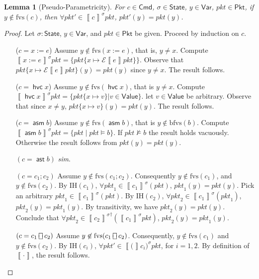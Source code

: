 \documentclass{article}
\newcommand{\pkt}{\mathit{pkt}}
\newcommand{\denote}[1]{\left\llbracket#1\right\rrbracket}
\newcommand{\edenote}[1]{\mathcal{E}\denote{#1}}
\newcommand{\Value}{\mathsf{Value}}
\newcommand{\Cmd}{\mathsf{Cmd}}
\newcommand{\Pkt}{\mathsf{Pkt}}
\newcommand{\Var}{\mathsf{Var}}
\newcommand{\State}{\mathsf{State}}
\newcommand{\assert}{\mathop{\mathsf{ast}}}
\newcommand{\assume}{\mathop{\mathsf{asm}}}
\newcommand{\choiceop}{\rotatebox[origin=c]{90}{$\sqsubset\!\!\!\sqsupset$}}
\newcommand{\choice}{\mathbin{\choiceop}}
\newcommand{\havoc}[1]{\mathop{\mathsf{hvc}}#1}
\newcommand{\fvs}{\textrm{fvs}}
\newcommand{\bfvs}{\textrm{bfvs}}
\theoremstyle{plain}
\newtheorem{lemma}{Lemma}
\theoremstyle{definition}
\theoremstyle{remark}
\begin{document}
\begin{lemma}[Pseudo-Parametricity]
  \label{lem:parametricity}
  For $c \in \Cmd$, $\sigma \in \State$, $y \in \Var$, $\pkt \in \Pkt$, if $y
  \not\in \fvs(c)$, then $\forall \pkt' \in \denote{c}^\sigma \pkt$, $\pkt'(y) =
  \pkt(y)$.
\end{lemma}

\begin{proof}
  Let $\sigma : \State $, $y \in \Var$, and $\pkt \in \Pkt$ be given.
  Proceed by induction on $c$.
  \begin{enumerate}[align=left]
  \item[($c = x := e$)] Assume $y \not \in \fvs(x:=e)$, that is, $y \neq x$.
    Compute $\denote{x:=e}^\sigma \pkt = \{\pkt\{ x \mapsto \edenote e
    \pkt\}\}$. Observe that $\pkt\{ x \mapsto \edenote e \pkt\}(y) = \pkt(y)$
    since $y \neq x$. The result follows.

  \item[($c = \havoc x$)] Assume $y \not \in \fvs(\havoc x)$, that is $y \neq
    x$. Compute $\denote{\havoc x}^\sigma\pkt = \{\pkt\{x \mapsto v\} | v \in
    \Value\}$. let $v \in \Value$ be arbitrary. Observe that since $x \neq y$,
    $\pkt\{x \mapsto v\}(y) = \pkt(y)$. The result follows.

  \item[($c = \assume b$)] Assume $y \not \in \fvs(\assume b)$, that is $y
    \not\in \bfvs(b)$. Compute $\denote{\assume b}^\sigma \pkt = \{\pkt \mid
    \pkt \models b\}$. If $\pkt \not\models b$ the result holds vacuously.
    Otherwise the result follows from $\pkt(y) = \pkt(y)$.

  \item[$(c = \assert b)$] \textit{sim}.

  \item[$(c = c_1;c_2)$] Assume $y \not \in \fvs(c_1;c_2)$. Consequently $y
    \not\in \fvs(c_1)$, and $y \not \in \fvs(c_2)$. By IH$(c_1)$, $\forall
    \pkt_1 \in \denote{c_1}^\sigma(\pkt)$, $\pkt_1(y) = pkt(y)$. Pick an
    arbitrary $\pkt_1 \in \denote{c_1}^\sigma(\pkt)$. By IH$(c_2)$, $\forall
    \pkt_2 \in \denote{c_1}^\sigma(\pkt_1)$, $\pkt_2(y) = \pkt_1(y)$. By
    transitivity, we have $\pkt_2(y) = \pkt(y)$. Conclude that $\forall \pkt_2
    \in {\denote{c_2}^\sigma}^\dagger (\denote{c_1}^\sigma \pkt)$, $\pkt_2(y) =
    \pkt_1(y)$.

  \item[$(c = c_1 \choice c_2)$] Assume $y \not \in \fvs(c_1 \choice c_2)$.
    Consequently, $y \not \in \fvs(c_1)$ and $y \not \in \fvs(c_2)$.
    By IH$(c_i)$, $\forall \pkt' \in \denote(c_i)^\sigma\pkt$, for $i = 1,2$.
    By definition of $\denote{\cdot}$, the result follows.


\end{enumerate}
\end{proof}
\end{document}
